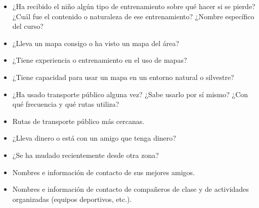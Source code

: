 \begin{itemize}
    \item ¿Ha recibido el niño algún tipo de entrenamiento sobre qué hacer si se pierde? ¿Cuál fue el contenido o naturaleza de ese entrenamiento? ¿Nombre específico del curso?
    \item ¿Lleva un mapa consigo o ha visto un mapa del área?
    \item ¿Tiene experiencia o entrenamiento en el uso de mapas?
    \item ¿Tiene capacidad para usar un mapa en un entorno natural o silvestre?
    \item ¿Ha usado transporte público alguna vez? ¿Sabe usarlo por sí mismo? ¿Con qué frecuencia y qué rutas utiliza?
    \item Rutas de transporte público más cercanas.
    \item ¿Lleva dinero o está con un amigo que tenga dinero?
    \item ¿Se ha mudado recientemente desde otra zona?
    \item Nombres e información de contacto de sus mejores amigos.
    \item Nombres e información de contacto de compañeros de clase y de actividades organizadas (equipos deportivos, etc.).
\end{itemize}


